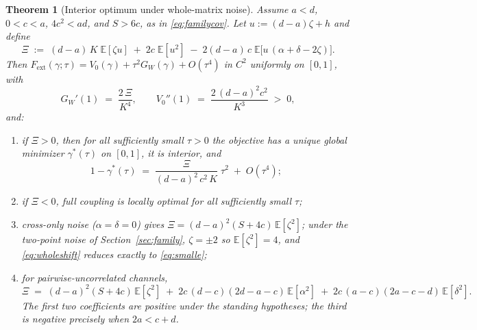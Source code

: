 \documentclass[11pt]{article}
\newtheorem{theorem}{Theorem}
\theoremstyle{remark}
\newcommand{\E}{\mathbb{E}}
\begin{document}
\begin{theorem}[Interior optimum under whole-matrix noise]
\label{thm:whole}
Assume $a < d$, $0 < c < a$, $4c^2 < ad$, and $S > 6c$, as in
\eqref{eq:familycov}. Let $u := (d-a)\zeta + h$ and define
\begin{equation}
  \Xi \;:=\; (d-a)\,K\;\E[\zeta u]
  \;+\; 2c\;\E[u^2]
  \;-\; 2(d-a)\,c\;\E\big[u\,(\alpha + \delta - 2\zeta)\big].
  \label{eq:Xi}
\end{equation}
Then $F_{\mathrm{ext}}(\gamma;\tau) = V_0(\gamma) + \tau^2 G_W(\gamma)
+ O(\tau^4)$ in $C^2$ uniformly on $[0,1]$, with
\[
  G_W'(1) \;=\; \frac{2\,\Xi}{K^4},
  \qquad
  V_0''(1) \;=\; \frac{2\,(d-a)^2 c^2}{K^3} \;>\; 0,
\]
and:
\begin{enumerate}
\item[\textup{(i)}] if $\Xi > 0$, then for all sufficiently small
$\tau > 0$ the objective has a unique global minimizer
$\gamma^*(\tau)$ on $[0,1]$, it is interior, and
\begin{equation}
  1 - \gamma^*(\tau) \;=\; \frac{\Xi}{(d-a)^2\,c^2\,K}\;\tau^2
  \;+\; O(\tau^4);
  \label{eq:wholeshift}
\end{equation}
\item[\textup{(ii)}] if $\Xi < 0$, full coupling is locally optimal for
all sufficiently small $\tau$;
\item[\textup{(iii)}] cross-only noise ($\alpha = \delta = 0$) gives
$\Xi = (d-a)^2 (S + 4c)\,\E[\zeta^2]$; under the two-point noise of
Section~\ref{sec:family}, $\zeta = \pm 2$ so $\E[\zeta^2] = 4$, and
\eqref{eq:wholeshift} reduces exactly to \eqref{eq:smalle};
\item[\textup{(iv)}] for pairwise-uncorrelated channels,
\begin{equation}
  \Xi \;=\; (d-a)^2 (S+4c)\,\E[\zeta^2]
  \;+\; 2c\,(d-c)(2d - a - c)\,\E[\alpha^2]
  \;+\; 2c\,(a-c)(2a - c - d)\,\E[\delta^2].
  \label{eq:Xiind}
\end{equation}
The first two coefficients are positive under the standing hypotheses;
the third is negative precisely when $2a < c + d$.
\end{enumerate}
\end{theorem}
\end{document}
